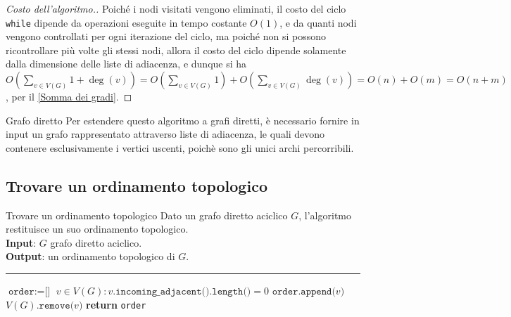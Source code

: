\documentclass[a4paper, 12pt]{report}
\begin{document}
    \begin{proof}[Costo dell'algoritmo.]
        Poiché i nodi visitati vengono eliminati, il costo del ciclo \texttt{while} dipende da operazioni eseguite in tempo costante $O(1)$, e da quanti nodi vengono controllati per ogni iterazione del ciclo, ma poiché non si possono ricontrollare più volte gli stessi nodi, allora il costo del ciclo dipende solamente dalla dimensione delle liste di adiacenza, e dunque si ha $\displaystyle O\left( \sum_{v \in V(G)}{1 + \deg(v)}\right)=O\left(\sum_{v \in V(G)}{1}\right) + O\left(\sum_{v \in V(G)}{\deg(v)}\right) = O(n) + O(m) = O(n+ m)$, per il \cref{Somma dei gradi}.
    \end{proof}

    \begin{framedobs}{Grafo diretto}
        Per estendere questo algoritmo a grafi diretti, è necessario fornire in input un grafo rappresentato attraverso liste di adiacenza, le quali devono contenere esclusivamente i vertici uscenti, poichè sono gli unici archi percorribili.
    \end{framedobs}

    \subsection{Trovare un ordinamento topologico}

    \begin{framedalgo}{Trovare un ordinamento topologico}
        Dato un grafo diretto aciclico $G$, l'algoritmo restituisce un suo ordinamento topologico.\\
        \textbf{Input}: $G$ grafo diretto aciclico.\\
        \textbf{Output}: un ordinamento topologico di $G$.

        \hrule
        \begin{algorithmic}[1]
                \State $\texttt{order} := \texttt{[}\texttt{]}$
                    \State $v \in V(G) : v.\texttt{incoming\_adjacent().length()} = 0$
                    \State $\texttt{order.append(}v\texttt{)}$
                    \State $V(G)\texttt{.remove(}v\texttt{)}$
                \EndWhile
                \State \textbf{return} \texttt{order}
            \EndFunction
        \end{algorithmic}
    \end{framedalgo}
\end{document}
